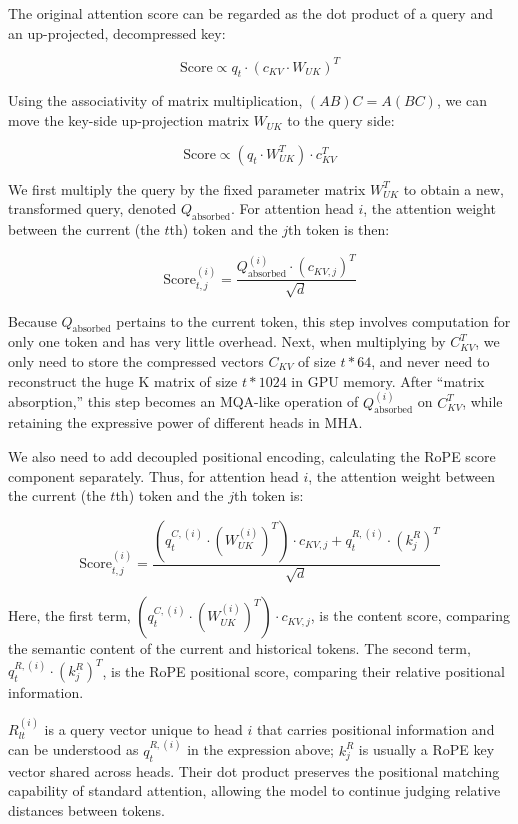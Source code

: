The original attention score can be regarded as the dot product of a query and an up-projected, decompressed key:

\[
\mathrm{Score} \propto q_t \cdot (c_{KV} \cdot W_{UK})^T
\]

Using the associativity of matrix multiplication, \((AB)C=A(BC)\), we can move the key-side up-projection matrix \(W_{UK}\) to the query side:

\[
\mathrm{Score} \propto (q_t \cdot W_{UK}^T) \cdot c_{KV}^T
\]

We first multiply the query by the fixed parameter matrix \(W_{UK}^T\) to obtain a new, transformed query, denoted \(Q_{\mathrm{absorbed}}\). For attention head \(i\), the attention weight between the current (the \(t\)th) token and the \(j\)th token is then:

\[
\mathrm{Score}_{t,j}^{(i)}
=
\frac{Q_{\mathrm{absorbed}}^{(i)} \cdot (c_{KV,j})^T}{\sqrt{d}}
\]

Because \(Q_{\mathrm{absorbed}}\) pertains to the current token, this step involves computation for only one token and has very little overhead. Next, when multiplying by \(C_{KV}^T\), we only need to store the compressed vectors \(C_{KV}\) of size \(t*64\), and never need to reconstruct the huge K matrix of size \(t*1024\) in GPU memory. After ``matrix absorption,'' this step becomes an MQA-like operation of \(Q_{\mathrm{absorbed}}^{(i)}\) on \(C_{KV}^T\), while retaining the expressive power of different heads in MHA.

We also need to add decoupled positional encoding, calculating the RoPE score component separately. Thus, for attention head \(i\), the attention weight between the current (the \(t\)th) token and the \(j\)th token is:

\[
\mathrm{Score}_{t,j}^{(i)}
=
\frac{
\left(q_t^{C,(i)} \cdot (W_{UK}^{(i)})^T\right) \cdot c_{KV,j}
+
q_t^{R,(i)} \cdot (k_j^R)^T
}{\sqrt{d}}
\]

Here, the first term, \(\left(q_t^{C,(i)} \cdot (W_{UK}^{(i)})^T\right) \cdot c_{KV,j}\), is the content score, comparing the semantic content of the current and historical tokens. The second term, \(q_t^{R,(i)} \cdot (k_j^R)^T\), is the RoPE positional score, comparing their relative positional information.

\(R_{lt}^{(i)}\) is a query vector unique to head \(i\) that carries positional information and can be understood as \(q_t^{R,(i)}\) in the expression above; \(k_j^R\) is usually a RoPE key vector shared across heads. Their dot product preserves the positional matching capability of standard attention, allowing the model to continue judging relative distances between tokens.

